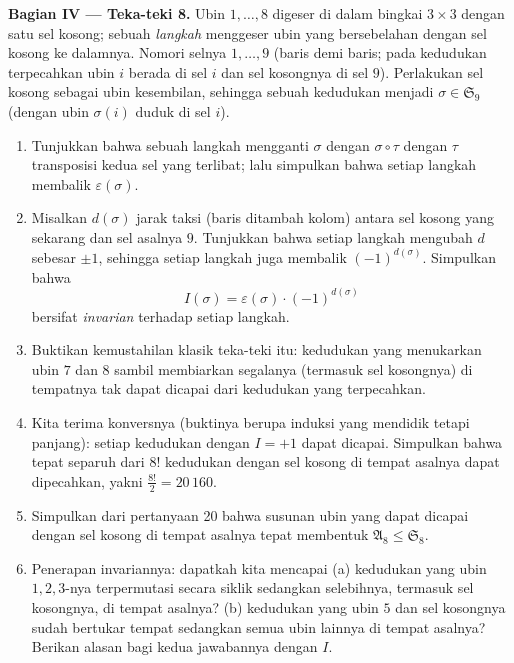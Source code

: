 \begin{problem}
\medskip
\noindent\textbf{Bagian IV --- Teka-teki 8.} Ubin $1, \dots, 8$
digeser di dalam bingkai $3 \times 3$ dengan satu sel kosong; sebuah \emph{langkah}
menggeser ubin yang bersebelahan dengan sel kosong ke dalamnya. Nomori selnya
$1, \dots, 9$ (baris demi baris; pada kedudukan terpecahkan ubin $i$ berada di
sel $i$ dan sel kosongnya di sel $9$). Perlakukan sel kosong sebagai
ubin kesembilan, sehingga sebuah kedudukan menjadi  $\sigma \in \mathfrak
S_9$ (dengan ubin $\sigma(i)$ duduk di sel $i$).
\begin{enumerate}[resume]
  \item Tunjukkan bahwa sebuah langkah mengganti $\sigma$ dengan $\sigma \circ \tau$
        dengan $\tau$ transposisi kedua sel yang
        terlibat; lalu simpulkan bahwa setiap langkah membalik
        $\varepsilon(\sigma)$.
  \item Misalkan $d(\sigma)$ jarak taksi (baris ditambah
        kolom) antara sel kosong yang sekarang dan sel
        asalnya $9$. Tunjukkan bahwa setiap langkah mengubah $d$ sebesar $\pm1$,
        sehingga setiap langkah juga membalik $(-1)^{d(\sigma)}$. Simpulkan bahwa
        \[
        I(\sigma) = \varepsilon(\sigma)\cdot(-1)^{d(\sigma)}
        \]
        bersifat \emph{invarian} terhadap setiap langkah.
  \item Buktikan kemustahilan klasik teka-teki itu: kedudukan
        yang menukarkan ubin $7$ dan $8$ sambil membiarkan segalanya
        (termasuk sel kosongnya) di tempatnya tak dapat dicapai
        dari kedudukan yang terpecahkan.
  \item Kita terima konversnya (buktinya berupa induksi yang mendidik tetapi
        panjang): setiap kedudukan dengan $I = +1$ dapat dicapai. Simpulkan
        bahwa tepat separuh dari $8!$ kedudukan
        dengan sel kosong di tempat asalnya dapat dipecahkan, yakni
        $\frac{8!}2 = 20\,160$.
  \item Simpulkan dari pertanyaan 20 bahwa susunan ubin yang dapat
        dicapai dengan sel kosong di tempat asalnya tepat membentuk
         $\mathfrak A_8 \leq \mathfrak S_8$.
  \item Penerapan invariannya: dapatkah kita mencapai (a) kedudukan
        yang ubin $1, 2, 3$-nya terpermutasi secara siklik
        sedangkan selebihnya, termasuk sel kosongnya, di tempat asalnya?
        (b) kedudukan yang ubin $5$ dan sel kosongnya sudah
        bertukar tempat sedangkan semua ubin lainnya di tempat asalnya? Berikan alasan
        bagi kedua jawabannya dengan $I$.
\end{enumerate}


\end{problem}
